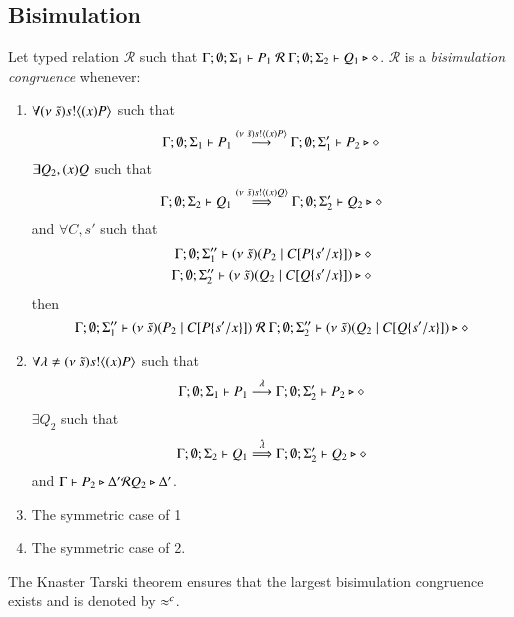 \subsection{Bisimulation}

\begin{definition}\rm
	Let typed relation $\mathcal{R}$ such that $\Gamma; \emptyset; \Sigma_1 \vdash P_1\ \mathcal{R}\ \Gamma; \emptyset; \Sigma_2 \vdash Q_1 \triangleright \diamond$.
	$\mathcal{R}$ is a {\em bisimulation congruence} whenever:
	\begin{enumerate}
		\item	$\forall (\nu\ \tilde{s}) s ! \langle (x)P \rangle$ such that
			\[
				\Gamma; \emptyset; \Sigma_1 \vdash P_1 \stackrel{(\nu\ \tilde{s}) s ! \langle (x)P \rangle}{\longrightarrow} \Gamma; \emptyset; \Sigma_1' \vdash P_2 \triangleright \diamond
			\]
			$\exists Q_2, (x)Q$ such that
			\[
				\Gamma; \emptyset; \Sigma_2 \vdash Q_1 \stackrel{(\nu\ \tilde{s}) s ! \langle (x)Q \rangle}{\Longrightarrow} \Gamma; \emptyset; \Sigma_2' \vdash Q_2 \triangleright \diamond
			\]
			and $\forall C, s'$ such that
			\begin{eqnarray*}
				\Gamma; \emptyset; \Sigma_1'' \vdash (\nu\ \tilde{s})(P_2 \;|\; C[P \{s'/x \}]) \triangleright \diamond \\
				\Gamma; \emptyset; \Sigma_2'' \vdash (\nu\ \tilde{s})(Q_2 \;|\; C[Q \{s'/x \}]) \triangleright \diamond
			\end{eqnarray*}
			then
			\[
				\Gamma; \emptyset; \Sigma_1'' \proves \newsp{\tilde{s}}{P_2 \Par \context{C}{P \subst{s'}{x}}}\ \mathcal{R}\ 
				\Gamma; \emptyset; \Sigma_2'' \proves \newsp{\tilde{s}}{Q_2 \Par \context{C}{Q \subst{s'}{x}}} \hastype \Proc
			\]

		\item	$\forall \lambda \not= (\nu\ \tilde{s}) s ! \langle (x)P \rangle$ such that
			\[
				\Gamma; \emptyset; \Sigma_1 \vdash P_1 \stackrel{\lambda}{\longrightarrow} \Gamma; \emptyset; \Sigma_2' \vdash P_2 \triangleright \diamond
			\]
			$\exists Q_2$ such that 
			\[
				\Gamma; \emptyset; \Sigma_2 \vdash Q_1 \stackrel{\hat{\lambda}}{\Longrightarrow} \Gamma; \emptyset; \Sigma_2' \vdash Q_2 \triangleright \diamond
			\]
			and
			$\Gamma \vdash P_2 \triangleright \Delta' \mathcal{R} Q_2 \triangleright \Delta'$.

		\item	The symmetric case of 1 
		\item	The symmetric case of 2.
	\end{enumerate}
	The Knaster Tarski theorem ensures that the largest bisimulation congruence exists and is denoted by $\approx^c$.
\end{definition}


